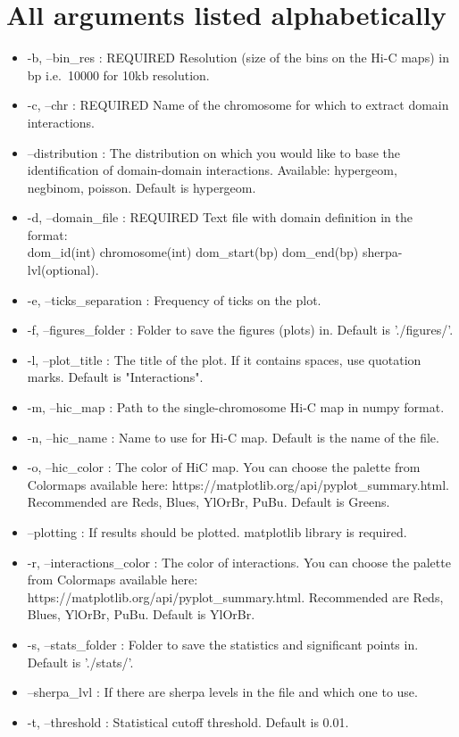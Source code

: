 \section{All arguments listed alphabetically}
\label{sec:arguments2}
\begin{itemize}
    \item -b, --bin\_res : REQUIRED Resolution (size of the bins on the Hi-C maps) in bp i.e.~10000 for 10kb resolution.
    \item -c, --chr : REQUIRED Name of the chromosome for which to extract domain interactions.
    \item --distribution : The distribution on which you would like to base the identification of domain-domain
    interactions. Available: hypergeom, negbinom, poisson. Default is hypergeom.
    \item -d, --domain\_file : REQUIRED Text file with domain definition in the format: \\
    dom\_id(int) chromosome(int) dom\_start(bp) dom\_end(bp) sherpa-lvl(optional).
    \item -e, --ticks\_separation : Frequency of ticks on the plot.
    \item -f, --figures\_folder : Folder to save the figures (plots) in. Default is './figures/'.
    \item -l, --plot\_title : The title of the plot. If it contains spaces, use quotation marks. Default is
    "Interactions".
    \item -m, --hic\_map : Path to the single-chromosome Hi-C map in numpy format.
    \item -n, --hic\_name : Name to use for Hi-C map. Default is the name of the file.
    \item -o, --hic\_color : The color of HiC map. You can choose the palette from Colormaps available here:
    https://matplotlib.org/api/pyplot\_summary.html. Recommended are Reds, Blues, YlOrBr, PuBu. Default is Greens.
    \item --plotting : If results should be plotted. matplotlib library is required.
    \item -r, --interactions\_color : The color of interactions. You can choose the palette from Colormaps available
    here: https://matplotlib.org/api/pyplot\_summary.html. Recommended are Reds, Blues, YlOrBr, PuBu. Default is YlOrBr.
    \item -s, --stats\_folder : Folder to save the statistics and significant points in. Default is './stats/'.
    \item --sherpa\_lvl : If there are sherpa levels in the file and which one to use.
    \item -t, --threshold :  Statistical cutoff threshold. Default is 0.01.
\end{itemize}
